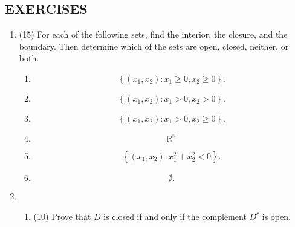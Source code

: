 \documentclass[12pt]{article}
\newtheorem*{solution}{Solution}
\newtheorem*{comments}{Comments}
\numberwithin{equation}{section}  %
\numberwithin{table}{section}
\numberwithin{algorithm}{section}
\def\Rn{\mathbb{R}^n}
\theoremstyle{definition}
\newcommand{\<}{\langle}
\renewcommand{\>}{\rangle}
\begin{document}
\subsection{EXERCISES}
\begin{enumerate}
\item
(15)  For each of the following sets, find the interior, the
closure, and the boundary. Then determine which of the sets are open,
closed, neither, or both.
\begin{enumerate}
\item
\[
\left\{
(x_1,x_2) : x_1 \geq 0, x_2 \geq 0
\right\}.
\]
\item
\[
\left\{
(x_1,x_2) : x_1 > 0, x_2 > 0
\right\}.
\]
\item
\[
\left\{
(x_1,x_2) : x_1 > 0, x_2 \geq 0
\right\}.
\]
\item  
\[
\Rn
\]
\item
\[
\left\{
(x_1,x_2) : x_1^2 + x_2^2 < 0
\right\}.
\]
\item
\[
\emptyset .
\]
\end{enumerate}
\item
\begin{enumerate}
\item (10) Prove that $D$ is closed if and only if the complement $D^c$
is open.

\end{enumerate}
\end{enumerate}
\end{document}
